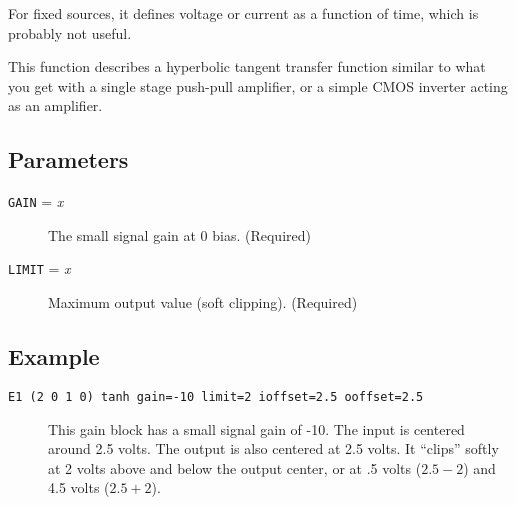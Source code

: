 For fixed sources, it defines voltage or current as a function of
time, which is probably not useful.

This function describes a hyperbolic tangent transfer function similar 
to what you get with a single stage push-pull amplifier, or a simple
CMOS inverter acting as an amplifier.
\subsection{Parameters}

\begin{description}

\item[{\tt GAIN} = {\it x}] The small signal gain at 0 bias.  (Required)

\item[{\tt LIMIT} = {\it x}] Maximum output value (soft clipping).
(Required)

\end{description}
\subsection{Example} 

\begin{description}

\item[{\tt E1 (2 0 1 0) tanh gain=-10 limit=2 ioffset=2.5 ooffset=2.5}] 
This gain block has a small signal gain of -10.  The input is
centered around 2.5 volts.  The output is also centered at 2.5 volts.
It ``clips'' softly at 2 volts above and below the output center, or
at .5 volts ($2.5 - 2$) and 4.5 volts ($2.5 + 2$).

\end{description}
